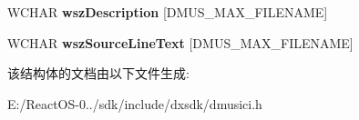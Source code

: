 \begin{DoxyCompactItemize}
\item 
\mbox{\label{struct___d_m_u_s___s_c_r_i_p_t___e_r_r_o_r_i_n_f_o_a96613f2d4adc7234d54164e6d6df0368}} 
W\+C\+H\+AR {\bfseries wsz\+Description} \mbox{[}D\+M\+U\+S\+\_\+\+M\+A\+X\+\_\+\+F\+I\+L\+E\+N\+A\+ME\mbox{]}
\item 
\mbox{\label{struct___d_m_u_s___s_c_r_i_p_t___e_r_r_o_r_i_n_f_o_a93c49c41c1d051df01d260b37c2b0dcc}} 
W\+C\+H\+AR {\bfseries wsz\+Source\+Line\+Text} \mbox{[}D\+M\+U\+S\+\_\+\+M\+A\+X\+\_\+\+F\+I\+L\+E\+N\+A\+ME\mbox{]}
\end{DoxyCompactItemize}


该结构体的文档由以下文件生成\+:\begin{DoxyCompactItemize}
\item 
E\+:/\+React\+O\+S-\/0../sdk/include/dxsdk/dmusici.\+h\end{DoxyCompactItemize}
